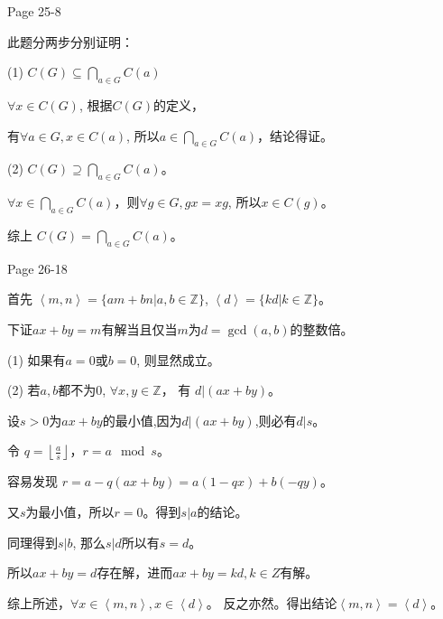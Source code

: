 \documentclass{ximera}
\begin{document}
\begin{problem} Page 25-8
    \begin{solution}
        此题分两步分别证明：
        
        (1) $C(G) \subseteq \bigcap_{a\in G} C(a)$

        $\forall x \in C(G)$, 根据$C(G)$的定义，

        有$\forall a \in G, x \in C(a)$, 所以$a \in \bigcap_{a\in G} C(a)$，结论得证。    

        (2) $C(G) \supseteq \bigcap_{a\in G} C(a)$。

        $\forall x \in \bigcap_{a\in G} C(a)$，则$\forall g \in G, gx=xg$,
        所以$x \in C(g)$。

        综上 $C(G) = \bigcap_{a\in G} C(a)$。
    \end{solution}
\end{problem}

\begin{problem} Page 26-18
    \begin{solution}
        首先 $\left \langle m, n \right \rangle = \{am+bn|a,b\in \mathbb{Z}\}$, $\left \langle d \right \rangle = \{kd|k\in \mathbb{Z}\}$。

        下证$ax+by=m$有解当且仅当$m$为$d=\gcd(a,b)$的整数倍。

        (1) 如果有$a=0$或$b=0$, 则显然成立。

        (2) 若$a,b$都不为$0$, $\forall x, y \in \mathbb{Z}$， 有 $d|(ax+by)$。
            
            设$s>0$为$ax+by$的最小值,因为$d|(ax+by)$,则必有$d|s$。

            令 $q = \left \lfloor \frac a s \right \rfloor$，$r = a \mod s$。
            
            容易发现 $r = a - q(ax + by) = a(1-qx)+b(-qy)$。

            又$s$为最小值，所以$r=0$。得到$s | a$的结论。

            同理得到$s | b$, 那么$s|d$所以有$s = d$。

            所以$ax+by=d$存在解，进而$ax+by=kd, k \in Z$有解。

        综上所述，$\forall x \in \left \langle m, n \right \rangle, x \in \left \langle d \right \rangle$。
        反之亦然。得出结论$\left \langle m, n \right \rangle = \left \langle d \right \rangle$。

            
    \end{solution}
\end{problem}
\end{document}
